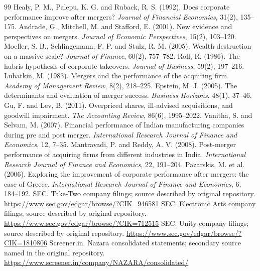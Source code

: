 \documentclass[11pt]{article}
\begin{document}
\begin{thebibliography}{99}
 Healy, P. M., Palepu, K. G. and Ruback, R. S. (1992). Does corporate performance improve after mergers? \emph{Journal of Financial Economics}, 31(2), 135--175.
 Andrade, G., Mitchell, M. and Stafford, E. (2001). New evidence and perspectives on mergers. \emph{Journal of Economic Perspectives}, 15(2), 103--120.
 Moeller, S. B., Schlingemann, F. P. and Stulz, R. M. (2005). Wealth destruction on a massive scale? \emph{Journal of Finance}, 60(2), 757--782.
 Roll, R. (1986). The hubris hypothesis of corporate takeovers. \emph{Journal of Business}, 59(2), 197--216.
 Lubatkin, M. (1983). Mergers and the performance of the acquiring firm. \emph{Academy of Management Review}, 8(2), 218--225.
 Epstein, M. J. (2005). The determinants and evaluation of merger success. \emph{Business Horizons}, 48(1), 37--46.
 Gu, F. and Lev, B. (2011). Overpriced shares, ill-advised acquisitions, and goodwill impairment. \emph{The Accounting Review}, 86(6), 1995--2022.
 Vanitha, S. and Selvam, M. (2007). Financial performance of Indian manufacturing companies during pre and post merger. \emph{International Research Journal of Finance and Economics}, 12, 7--35.
 Mantravadi, P. and Reddy, A. V. (2008). Post-merger performance of acquiring firms from different industries in India. \emph{International Research Journal of Finance and Economics}, 22, 191--204.
 Pazarskis, M. et al. (2006). Exploring the improvement of corporate performance after mergers: the case of Greece. \emph{International Research Journal of Finance and Economics}, 6, 184--192.
 SEC. Take-Two company filings; source described by original repository. \url{https://www.sec.gov/edgar/browse/?CIK=946581}
 SEC. Electronic Arts company filings; source described by original repository. \url{https://www.sec.gov/edgar/browse/?CIK=712515}
 SEC. Unity company filings; source described by original repository. \url{https://www.sec.gov/edgar/browse/?CIK=1810806}
 Screener.in. Nazara consolidated statements; secondary source named in the original repository. \url{https://www.screener.in/company/NAZARA/consolidated/}

\end{thebibliography}
\end{document}
